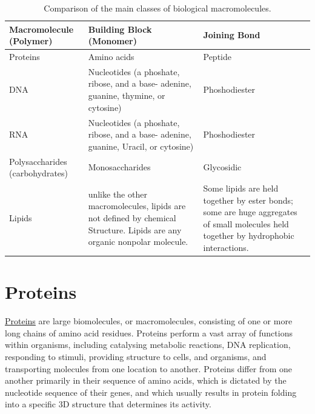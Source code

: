 \onecolumn
\begin{table}

\caption{\label{tab:biomacromolecules}Comparison of the main classes of biological macromolecules.}
\centering
\begin{tabular}[t]{>{\raggedright\arraybackslash}p{10em}>{\raggedright\arraybackslash}p{20em}>{\raggedright\arraybackslash}p{20em}}
\toprule
Macromolecule (Polymer) & Building Block (Monomer) & Joining Bond\\
\midrule
\rowcolor{gray!6}  Proteins & Amino acids & Peptide\\
DNA & Nucleotides (a phoshate, ribose, and a base- adenine, guanine, thymine, or cytosine) & Phoshodiester\\
\rowcolor{gray!6}  RNA & Nucleotides (a phoshate, ribose, and a base- adenine, guanine, Uracil, or cytosine) & Phoshodiester\\
Polysaccharides (carbohydrates) & Monosaccharides & Glycosidic\\
\rowcolor{gray!6}  Lipids & unlike the other macromolecules, lipids are not defined by chemical Structure. Lipids are any organic nonpolar molecule. & Some lipids are held together by ester bonds; some are huge aggregates of small molecules held together by hydrophobic interactions.\\
\bottomrule
\end{tabular}
\end{table}
\twocolumn

\hypertarget{proteins}{%
\section{Proteins}\label{proteins}}

\href{https://en.wikipedia.org/wiki/Protein}{Proteins} are large biomolecules, or macromolecules, consisting of one or more long chains of amino acid residues. Proteins perform a vast array of functions within organisms, including catalysing metabolic reactions, DNA replication, responding to stimuli, providing structure to cells, and organisms, and transporting molecules from one location to another. Proteins differ from one another primarily in their sequence of amino acids, which is dictated by the nucleotide sequence of their genes, and which usually results in protein folding into a specific 3D structure that determines its activity.

